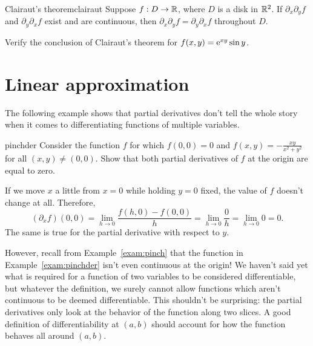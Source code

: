 \documentclass{watsonbook}
\begin{document}
\begin{theo}{Clairaut's theorem}{clairaut}
  Suppose $f:D \to \mathbb{R}$, where $D$ is a disk in $\mathbb{R}^2$. If
  $\partial_x \partial_y f$ and $\partial_y \partial_x f$ exist and
  are continuous, then $\partial_x \partial_y f = \partial_y
  \partial_x f$ throughout $D$. 
\end{theo}

\begin{exercise}{}{}
  Verify the conclusion of Clairaut's theorem for $f(x,y) = \mathrm{e}^{xy}
  \sin y$. 
\end{exercise}

\section{Linear approximation} \label{sec:linapprox} 


The following example shows that partial derivatives don't tell the
whole story when it comes to differentiating functions of multiple
variables.

\begin{example}{}{pinchder}
  Consider the function $f$ for which $f(0,0)=0$ and $f(x,y) =
  -\frac{xy}{x^2 + y^2}$ for all $(x,y) \neq (0,0)$. Show that both
  partial derivatives of $f$ at the origin are equal to zero. 
\end{example}

\begin{solution}
  If we move $x$ a little from $x=0$ while holding $y=0$ fixed, the
  value of $f$ doesn't change at all. Therefore,
  \[
    (\partial_x f)(0,0) = \lim_{h \to 0} \frac{f(h,0) - f(0,0)}{h} =
    \lim_{h \to 0} \frac{0}{h} =  \lim_{h \to 0} 0 = 0. 
  \]
  The same is true for the partial derivative with respect to $y$. 
\end{solution}

However, recall from Example~\ref{exam:pinch} that the function in
Example~\ref{exam:pinchder} isn't even continuous at the origin! We
haven't said yet what is required for a function of two variables to
be considered differentiable, but whatever the definition, we surely
cannot allow functions which aren't continuous to be deemed
differentiable. This shouldn't be surprising: the partial derivatives
only look at the behavior of the function along two slices. A good
definition of differentiability at $(a,b)$ should account for how the
function behaves all around $(a,b)$.
\end{document}

